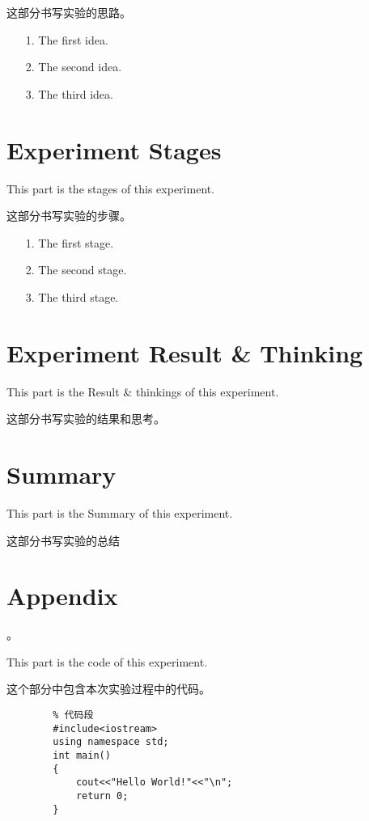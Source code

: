 \documentclass[UTF8,12pt,a4paper]{report}
\begin{document}
	
	这部分书写实验的思路。
	
	\begin{enumerate}
	\item[1.] The first idea.
	\item[2.] The second idea.
	\item[3.] The third idea.
	\end{enumerate}
	
	\section{Experiment Stages}
	This part is the stages of this experiment.
	
	
	这部分书写实验的步骤。
	
	\begin{enumerate}
	\item[1.] The first stage.
	\item[2.] The second stage.
	\item[3.] The third stage.
	\end{enumerate}
	
	
	\section{Experiment Result \& Thinking}
	This part is the Result \& thinkings of this experiment.
	
	
	这部分书写实验的结果和思考。
	
	
	\section{Summary}
	This part is the Summary of this experiment.
	
	
	这部分书写实验的总结
	
	
	\section{Appendix}。
	
	
	This part is the code of this experiment.
	
	
	这个部分中包含本次实验过程中的代码。
	\begin{lstlisting}
		% 代码段
		#include<iostream>
		using namespace std;
		int main()
		{
			cout<<"Hello World!"<<"\n";
			return 0;	
		}
	\end{lstlisting}
	
\end{document}

